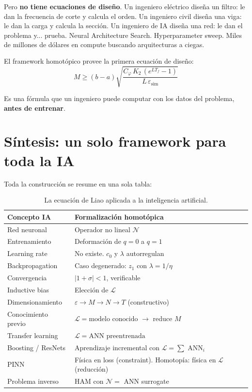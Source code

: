 \documentclass[11pt,a4paper]{article}
\begin{document}
Pero \textbf{no tiene ecuaciones de dise\~no}. Un ingeniero el\'ectrico dise\~na un filtro: le dan la frecuencia de corte y calcula el orden. Un ingeniero civil dise\~na una viga: le dan la carga y calcula la secci\'on. Un ingeniero de IA dise\~na una red: le dan el problema y... prueba. Neural Architecture Search. Hyperparameter sweep. Miles de millones de d\'olares en compute buscando arquitecturas a ciegas.

El framework homot\'opico provee la primera ecuaci\'on de dise\~no:
$$M \geq (b-a)\sqrt{\frac{C_\varphi\,K_2\,(e^{LT_f}-1)}{L\,\varepsilon_{\mathrm{sim}}}}$$

Es una f\'ormula que un ingeniero puede computar con los datos del problema, \textbf{antes de entrenar}.


\section{S\'intesis: un solo framework para toda la IA}

Toda la construcci\'on se resume en una sola tabla:

\begin{table}[H]
\centering
\caption{La ecuaci\'on de Liao aplicada a la inteligencia artificial.}
\label{tab:synthesis}
\begin{tabular}{L{3.5cm} L{10.5cm}}
\toprule
\textbf{Concepto IA} & \textbf{Formalizaci\'on homot\'opica} \\
\midrule
Red neuronal & Operador no lineal $\mathcal{N}$ \\
Entrenamiento & Deformaci\'on de $q=0$ a $q=1$ \\
Learning rate & No existe. $c_0$ y $\lambda$ autorregulan \\
Backpropagation & Caso degenerado: $z_1$ con $\lambda = 1/\eta$ \\
Convergencia & $|1+\sigma| < 1$, verificable \\
Inductive bias & Elecci\'on de $\mathcal{L}$ \\
Dimensionamiento & $\varepsilon \to M \to N \to T$ (constructivo) \\
Conocimiento previo & $\mathcal{L} = \text{modelo conocido}$ $\to$ reduce $M$ \\
Transfer learning & $\mathcal{L} = \text{ANN preentrenada}$ \\
Boosting / ResNets & Aprendizaje incremental con $\mathcal{L} = \sum$ ANN$_i$ \\
PINN & F\'isica en loss (constraint). Homotop\'ia: f\'isica en $\mathcal{L}$ (reducci\'on) \\
Problema inverso & HAM con $\mathcal{N} = $ ANN surrogate \\
\bottomrule
\end{tabular}
\end{table}
\end{document}
